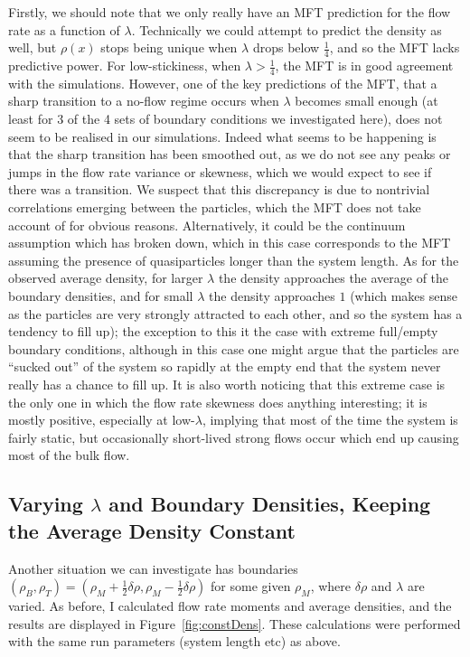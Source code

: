 Firstly, we should note that we only really have an MFT prediction for the flow rate as a function of $\lambda$. Technically we could attempt to predict the density as well, but $\rho(x)$ stops being unique when $\lambda$ drops below $\frac{1}{4}$,
and so the MFT lacks predictive power. For low-stickiness, when $\lambda>\frac{1}{4}$, the MFT is in good agreement with the simulations.
However, one of the key predictions of the MFT, that a sharp transition to a no-flow regime occurs when $\lambda$ becomes small enough (at least for 3 of the 4 sets of
boundary conditions we investigated here), does not seem to be realised in our simulations. Indeed what seems to be happening is that the sharp transition has been smoothed out, as we
do not see any peaks or jumps in the flow rate variance or skewness, which we would expect to see if there was a transition. We suspect that this discrepancy is due to nontrivial correlations emerging between the particles, which the MFT
does not take account of for obvious reasons. Alternatively, it could be the continuum assumption which has broken down, which in this case corresponds to the MFT assuming the presence of quasiparticles longer than the system length.
As for the observed average density, for larger $\lambda$ the density approaches the average of the boundary densities,
and for small $\lambda$ the density approaches $1$ (which makes sense as the particles are very strongly attracted to each other, and so the system has a tendency to fill up); the exception to this it the case with extreme full/empty boundary
conditions, although in this case one might argue that the particles are ``sucked out'' of the system so rapidly at the empty end that the system never really has a chance to fill up. It is also worth noticing that this extreme case is the only
one in which the flow rate skewness does anything interesting; it is mostly positive, especially at low-$\lambda$, implying that most of the time the system is fairly static, but occasionally short-lived strong flows occur which end up causing
most of the bulk flow.


\subsection{Varying $\lambda$ and Boundary Densities, Keeping the Average Density Constant}
Another situation we can investigate has boundaries $(\rho_B, \rho_T) = (\rho_M + \frac{1}{2} \delta\rho, \rho_M - \frac{1}{2} \delta\rho)$ for some given $\rho_M$, where $\delta\rho$ and $\lambda$ are varied. As before, I calculated flow rate
moments and average densities, and the results are displayed in Figure~\ref{fig:constDens}. These calculations were performed with the same run parameters (system length etc)
as above.


